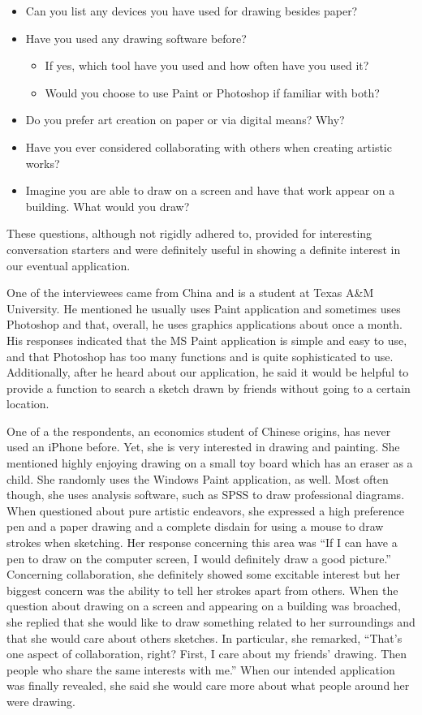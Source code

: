 \documentclass{chi2009}
\begin{document}
\begin{itemize}
\item Can you list any devices you have used for drawing besides paper?
\item Have you used any drawing software before?
	\begin{itemize}
	\item If yes, which tool have you used and how often have you used it? 
	\item Would you choose to use Paint or Photoshop if familiar with both?
	\end{itemize}
\item Do you prefer art creation on paper or via digital means?  Why?
\item Have you ever considered collaborating with others when creating artistic works?
\item Imagine you are able to draw on a screen and have that work appear on a
	building.  What would you draw?
\end{itemize}

These questions, although not rigidly adhered to, provided for interesting
conversation starters and were definitely useful in showing a definite interest
in our eventual application.

One of the interviewees came from China and is a student at Texas A\&M
University.  He mentioned he usually uses Paint application and sometimes uses
Photoshop and that, overall, he uses graphics applications about once a month.
His responses indicated that the MS Paint application is simple and easy to
use, and that Photoshop has too many functions and is quite sophisticated to
use.  Additionally, after he heard about our application, he said it would be
helpful to provide a function to search a sketch drawn by friends without going
to a certain location.

One of a the respondents, an economics student of Chinese origins, has never used an
iPhone before.  Yet, she is very interested in drawing and painting.  She
mentioned highly enjoying drawing on a small toy board which has an eraser as 
a child.  She randomly uses the Windows Paint application, as well.  Most often
though, she uses analysis software, such as SPSS to draw professional diagrams.
When questioned about pure artistic endeavors, she expressed a high preference
pen and a paper drawing and a complete disdain for using a mouse to draw strokes
when sketching. Her response concerning this area was ``If I can have a pen to
draw on the computer screen, I would definitely draw a good picture.''
Concerning collaboration, she definitely showed some excitable interest but her
biggest concern was the ability to tell her strokes apart from others.   When
the question about drawing on a screen and appearing on a building was
broached, she replied that she would like to draw something related to her
surroundings and that she would care about others sketches.  In particular, she
remarked, ``That's one aspect of collaboration, right? First, I care about my
friends' drawing. Then people who share the same interests with me.'' 
When our intended application was finally revealed, she said she would care
more about what people around her were drawing.
\end{document}
